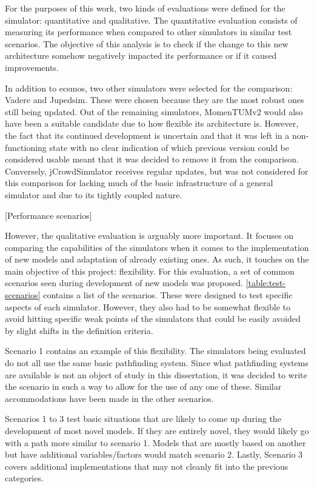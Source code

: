 \documentclass[twoside, 11pt]{article}
\begin{document}
For the purposes of this work, two kinds of evaluations were defined for the simulator: quantitative and qualitative. The quantitative evaluation consists of measuring its performance when compared to other simulators in similar test scenarios. The objective of this analysis is to check if the change to this new architecture somehow negatively impacted its performance or if it caused improvements.

In addition to \gls{ecsmos}, two other simulators were selected for the comparison: Vadere and Jupedsim. These were chosen because they are the most robust ones still being updated. Out of the remaining simulators, MomenTUMv2 would also have been a suitable candidate due to how flexible its architecture is. However, the fact that its continued development is uncertain and that it was left in a non-functioning state with no clear indication of which previous version could be considered usable meant that it was decided to remove it from the comparison. Conversely, jCrowdSimulator receives regular updates, but was not considered for this comparison for lacking much of the basic infrastructure of a general simulator and due to its tightly coupled nature.

[Performance scenarios]

However, the qualitative evaluation is arguably more important. It focuses on comparing the capabilities of the simulators when it comes to the implementation of new models and adaptation of already existing ones. As such, it touches on the main objective of this project: flexibility. For this evaluation, a set of common scenarios seen during development of new models was proposed. \autoref{table:test-scenarios} contains a list of the scenarios. These were designed to test specific aspects of each simulator. However, they also had to be somewhat flexible to avoid hitting specific weak points of the simulators that could be easily avoided by slight shifts in the definition criteria. 

Scenario 1 contains an example of this flexibility. The simulators being evaluated do not all use the same basic pathfinding system. Since what pathfinding systems are available is not an object of study in this dissertation, it was decided to write the scenario in such a way to allow for the use of any one of these. Similar accommodations have been made in the other scenarios. 

Scenarios 1 to 3 test basic situations that are likely to come up during the development of most novel models. If they are entirely novel, they would likely go with a path more similar to scenario 1. Models that are mostly based on another but have additional variables/factors would match scenario 2. Lastly, Scenario 3 covers additional implementations that may not cleanly fit into the previous categories.
\end{document}
